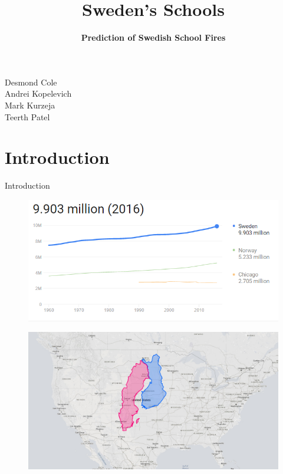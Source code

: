 \documentclass{beamer}
\title{Sweden's Schools}
\date{}
\subtitle{\textbf{Prediction of Swedish School Fires}}
\institute[Inst.]{University of Michigan}
\newcommand{\n}{\newline}
\begin{document}
\begin{frame}
\titlepage
\fontsize{9pt}{10}\selectfont
Desmond Cole \\ Andrei Kopelevich \\ Mark Kurzeja \\ Teerth Patel\\

\end{frame}

\section{Introduction}

\begin{frame}{Introduction}
 {
\begin{figure}
	\centering
	\includegraphics[width=1\linewidth]{swedPop}
\end{figure}
}
 {
\begin{figure}
	\centering
	\includegraphics[width=1\linewidth]{swedenusa}
\end{figure}
}
\end{frame}
\end{document}
